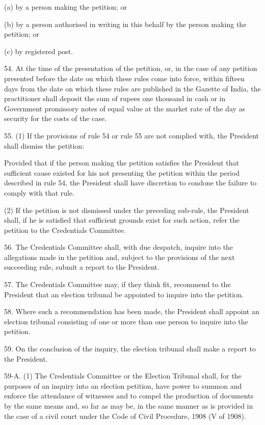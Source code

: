 (a) by a person making the petition; or

(b) by a person authorised in writing in this behalf by the person making the petition; or

(c) by registered post.



54. At the time of the presentation of the petition, or, in the case of any petition presented before the date on which these rules come into force, within fifteen days from the date on which these rules are published in the Gazette of India, the practitioner shall deposit the sum of rupees one thousand in cash or in Government promissory notes of equal value at the market rate of the day as security for the costs of the case.



55. (1) If the provisions of rule 54 or rule 55 are not complied with, the President shall dismiss the petition:



Provided that if the person making the petition satisfies the President that sufficient cause existed for his not presenting the petition within the period described in rule 54, the President shall have discretion to condone the failure to comply with that rule.

(2) If the petition is not dismissed under the preceding sub-rule, the President shall, if he is satisfied that sufficient grounds exist for such action, refer the petition to the Credentials Committee.



56. The Credentials Committee shall, with due despatch, inquire into the allegations made in the petition and, subject to the provisions of the next succeeding rule, submit a report to the President.



57. The Credentials Committee may, if they think fit, recommend to the President that an election tribunal be appointed to inquire into the petition.



58. Where such a recommendation has been made, the President shall appoint an election tribunal consisting of one or more than one person to inquire into the petition. 



59. On the conclusion of the inquiry, the election tribunal shall make a report to the President.



59-A. (1) The Credentials Committee or the Election Tribunal shall, for the purposes of an inquiry into an election petition, have power to summon and enforce the attendance of witnesses and to compel the production of documents by the same means and, so far as may be, in the same manner as is provided in the case of a civil court under the Code of Civil Procedure, 1908 (V of 1908).



